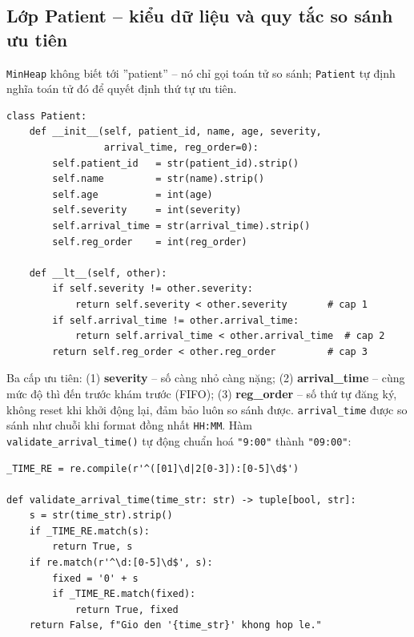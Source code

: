 \documentclass[12pt,a4paper]{report}
\begin{document}
\subsection{Lớp Patient -- kiểu dữ liệu và quy tắc so sánh ưu tiên}

\texttt{MinHeap} không biết tới ''patient'' -- nó chỉ gọi toán tử
so sánh; \texttt{Patient} tự định nghĩa toán tử đó để quyết định thứ tự
ưu tiên.

\begin{lstlisting}[caption=Khởi tạo và quy tắc so sánh ưu tiên 3 cấp (patient.py)]
class Patient:
    def __init__(self, patient_id, name, age, severity,
                 arrival_time, reg_order=0):
        self.patient_id   = str(patient_id).strip()
        self.name         = str(name).strip()
        self.age          = int(age)
        self.severity     = int(severity)
        self.arrival_time = str(arrival_time).strip()
        self.reg_order    = int(reg_order)

    def __lt__(self, other):
        if self.severity != other.severity:
            return self.severity < other.severity       # cap 1
        if self.arrival_time != other.arrival_time:
            return self.arrival_time < other.arrival_time  # cap 2
        return self.reg_order < other.reg_order         # cap 3
\end{lstlisting}

Ba cấp ưu tiên: (1) \textbf{severity} -- số càng nhỏ càng nặng; (2)
\textbf{arrival\_time} -- cùng mức độ thì đến trước khám trước (FIFO); (3)
\textbf{reg\_order} -- số thứ tự đăng ký, không reset khi khởi động
lại, đảm bảo luôn so sánh được.
\newpage
\texttt{arrival\_time} được so sánh như chuỗi khi format đồng nhất
\texttt{HH:MM}. Hàm \\\texttt{validate\_arrival\_time()} tự động chuẩn hoá
\texttt{"9:00"} thành \texttt{"09:00"}:

\begin{lstlisting}[caption=Tự động chuẩn hoá định dạng giờ (patient.py)]
_TIME_RE = re.compile(r'^([01]\d|2[0-3]):[0-5]\d$')

def validate_arrival_time(time_str: str) -> tuple[bool, str]:
    s = str(time_str).strip()
    if _TIME_RE.match(s):
        return True, s
    if re.match(r'^\d:[0-5]\d$', s):
        fixed = '0' + s
        if _TIME_RE.match(fixed):
            return True, fixed
    return False, f"Gio den '{time_str}' khong hop le."
\end{lstlisting}
\end{document}
